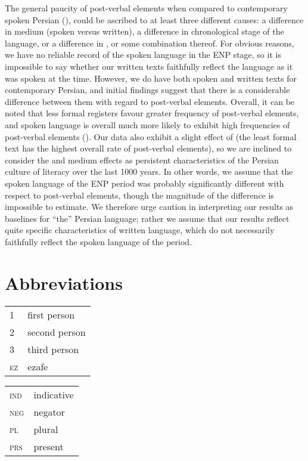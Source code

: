 \documentclass[output=paper,colorlinks,citecolor=brown,draftmode]{langscibook}
\begin{document}
The general paucity of post-verbal elements when compared to contemporary spoken Persian (), could be ascribed to at least three different causes: a difference in medium (spoken versus written), a difference in chronological stage of the language, or a difference in , or some combination thereof. For obvious reasons, we have no reliable record of the spoken language in the ENP stage, so it is impossible to say whether our written texts faithfully reflect the language as it was spoken at the time. However, we do have both spoken and written texts for contemporary Persian, and initial findings suggest that there is a considerable difference between them with regard to post-verbal elements. Overall, it can be noted that less formal registers favour greater frequency of post-verbal elements, and spoken language is overall much more likely to exhibit high frequencies of post-verbal elements (). Our data also exhibit a slight effect of  (the least formal text has the highest overall rate of post-verbal elements), so we are inclined to consider the  and medium effects as persistent characteristics of the Persian culture of literacy over the last 1000 years. In other words, we assume that the spoken language of the ENP period was probably significantly different with respect to post-verbal elements, though the magnitude of the difference is impossible to estimate. We therefore urge caution in interpreting our results as baselines for ``the'' Persian language; rather we assume that our results reflect quite specific characteristics of written language, which do not necessarily faithfully reflect the spoken language of the period.

\section*{Abbreviations}
\begin{tabularx}{.45\textwidth}{@{}lQ@{}}
1 & first person \\
2 & second person \\
3 & third person \\
\textsc{ez} & ezafe \\
\end{tabularx}
\begin{tabularx}{.45\textwidth}{@{}lQ@{}}
\textsc{ind} & indicative \\
\textsc{neg} & negator \\
\textsc{pl} & plural \\
\textsc{prs} & present \\
\end{tabularx}
\end{document}
